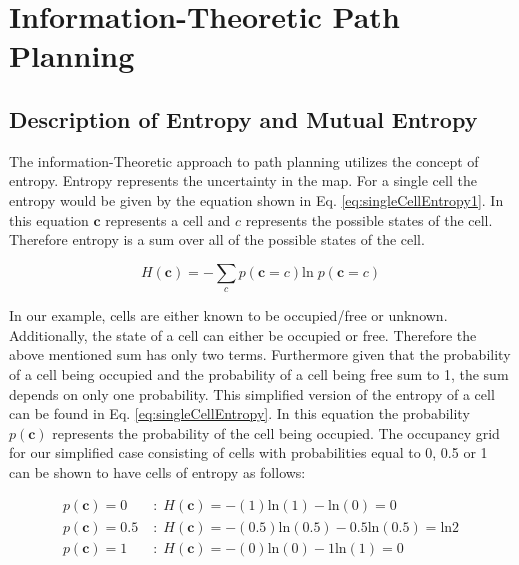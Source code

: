 \documentclass[a4paper,12pt]{article}
\begin{document}
	
	\section{Information-Theoretic Path Planning}
		
		\subsection{Description of Entropy and Mutual Entropy}
			The information-Theoretic approach to path planning utilizes the concept of entropy. Entropy represents the uncertainty in the map. For a single cell the entropy would be given by the equation shown in Eq. \ref{eq:singleCellEntropy1}. In this equation $\textbf{c}$ represents a cell and $c$ represents the possible states of the cell. Therefore entropy is a sum over all of the possible states of the cell.

			\begin{equation}
				H \left(\textbf{c}\right) = - \sum_{c} p\left(\textbf{c}=c\right)\text{ln} \; p\left(\textbf{c}=c\right)
				\label{eq:singleCellEntropy1}
			\end{equation}
			
			In our example, cells are either known to be occupied/free or unknown. Additionally, the state of a cell can either be occupied or free. Therefore the above mentioned sum has only two terms. Furthermore given that the probability of a cell being occupied and the probability of a cell being free sum to 1, the sum depends on only one probability. This simplified version of the entropy of a cell can be found in Eq. \ref{eq:singleCellEntropy}. In this equation the probability $p\left(\textbf{c}\right)$ represents the probability of the cell being occupied. The occupancy grid for our simplified case consisting of cells with probabilities equal to 0, 0.5 or 1 can be shown to have cells of entropy as follows:

			\begin{align}
				\nonumber p\left(\textbf{c}\right) = 0 \; &: \; H \left(\textbf{c}\right) = -(1)\text{ln}(1)-\text{ln}(0) = 0 \\
				\nonumber p\left(\textbf{c}\right) = 0.5 \; &: \; H \left(\textbf{c}\right) = -(0.5)\text{ln}(0.5)-0.5\text{ln}(0.5) = \text{ln}2 \\
				\nonumber p\left(\textbf{c}\right) = 1 \; &: \; H \left(\textbf{c}\right) = -(0)\text{ln}(0)-1\text{ln}(1) = 0 \\
			\end{align}
\end{document}
